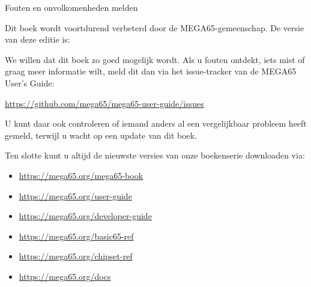 \newpage
{\huge Fouten en onvolkomenheden melden}\vspace{1cm}

Dit boek wordt voortdurend verbeterd door de MEGA65-gemeenschap.
De versie van deze editie is:



We willen dat dit boek zo goed mogelijk wordt. Als u fouten ontdekt,
iets mist of graag meer informatie wilt, meld dit dan via het
issue-tracker van de MEGA65 User's Guide:

\url{https://github.com/mega65/mega65-user-guide/issues}

U kunt daar ook controleren of iemand anders al een vergelijkbaar
probleem heeft gemeld, terwijl u wacht op een update van dit boek.

Ten slotte kunt u altijd de nieuwste versies van onze boekenserie downloaden via:

\begin{itemize}
\item \url{https://mega65.org/mega65-book}
\item \url{https://mega65.org/user-guide}
\item \url{https://mega65.org/developer-guide}
\item \url{https://mega65.org/basic65-ref}
\item \url{https://mega65.org/chipset-ref}
\item \url{https://mega65.org/docs}
\end{itemize}
